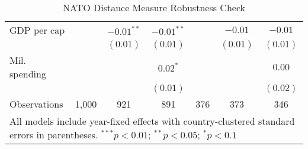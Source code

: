\begin{table}[h]
\begin{center}
\begin{tabular}{l c c c c c c}
\quad GDP per cap     &               & $-0.01^{**}$  & $-0.01^{**}$  &             & $-0.01$      & $-0.01$      \\
                      &               & $(0.01)$      & $(0.01)$      &             & $(0.01)$     & $(0.01)$     \\
\quad Mil. spending   &               &               & $0.02^{*}$    &             &              & $0.00$       \\
                      &               &               & $(0.01)$      &             &              & $(0.02)$     \\
\hline
Observations          & 1,000         & 921           & 891           & 376         & 373          & 346          \\
\hline
\multicolumn{7}{l}{\scriptsize{All models include year-fixed effects with country-clustered standard errors in parentheses. $^{***}p<0.01$; $^{**}p<0.05$; $^{*}p<0.1$}}
\end{tabular}
\caption{NATO Distance Measure Robustness Check}
\label{table:alt-dist}
\end{center}
\end{table}
